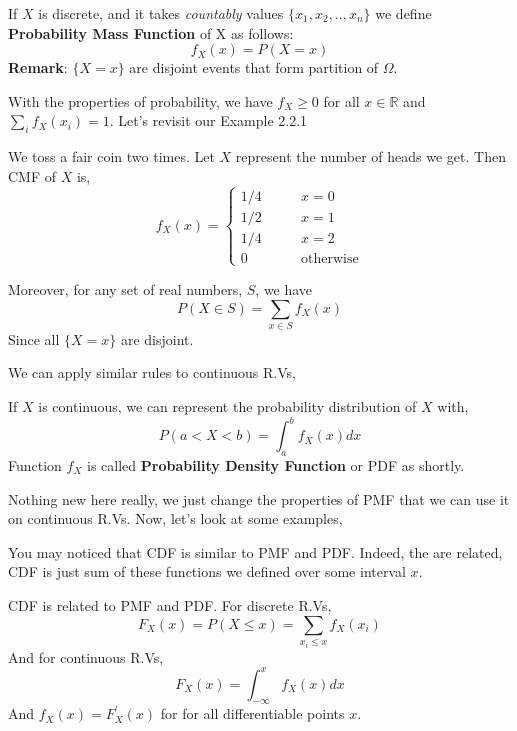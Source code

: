 \begin{definition}
    If $X$ is discrete, and it takes \textit{countably} values $ \{ x_1,x_2,..,x_n \}$ we define \textbf{Probability Mass Function} of X as follows:
    $$f_X(x)= P(X = x)$$
    \textbf{Remark}: $ \{ X=x \} $ are disjoint events that form partition of $\Omega$.
\end{definition}

   With the properties of probability, we have $f_X \ge 0$ for all $x \in \mathbb{R}$ and $\sum_{i} f_X (x_i) =1 $. Let's revisit our Example 2.2.1

   \begin{example}
    We toss a fair coin two times. Let $X$ represent the number of heads we get. Then CMF of $X$ is,
    \[f_X(x) = 
        \begin{cases} 
          1/4 \qquad &x=0\\
          1/2 \qquad &x=1 \\
          1/4 \qquad &x=2\\
          0 \qquad &\text{otherwise}
        \end{cases} 
\]
\end{example}



Moreover, for any set of real numbers, $S$, we have
\[ P (X \in S) = \sum_{x \in S} f_X(x)\]
Since all $\{X = x \}$  are disjoint.\\
\par
We can apply similar rules to continuous R.Vs,
\begin{definition}
    If $X$ is continuous, we can represent the probability distribution of $X$ with,
    \[ P(a < X < b) = \int_{a}^{b} f_X(x) dx \]
    Function  $f_X$ is called \textbf{Probability Density Function} or PDF as shortly.
\end{definition}
Nothing new here really, we just change the properties of PMF that we can use it on continuous R.Vs. Now, let's look at some examples,\\
\lipsum[1-5] \newline
\par
You may noticed that CDF is similar to PMF and PDF. Indeed, the are related, CDF is just sum of these functions we defined over some interval $x$.
\begin{definition}
    CDF is related to PMF and PDF. For discrete R.Vs,
    \[F_X(x) = P(X \le x) = \sum_{x_i \le x} f_X(x_i)\]
    And for continuous R.Vs,
    \[F_X(x)= \int_{-\infty}^x f_X(x)dx \]
    And $f_X(x) = F_X^{'}(x)$ for for all differentiable points $x$.
\end{definition}
\par



